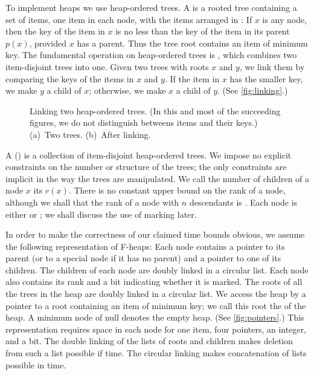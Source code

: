 To implement heaps we use heap-ordered trees. A  is a rooted
tree containing a set of items, one item in each node, with the items arranged in
: If \(x\) is any node, then the key of the item in \(x\) is no less
than the key of the item in its parent \(p(x)\), provided \(x\) has a parent. Thus
the tree root contains an item of minimum key. The fundamental operation on
heap-ordered trees is , which combines two item-disjoint trees into
one. Given two trees with roots \(x\) and \(y\), we link them by comparing the keys
of the items in \(x\) and \(y\). If the item in \(x\) has the smaller key, we make
\(y\) a child of \(x\); otherwise, we make \(x\) a child of \(y\). (See
\autoref{fig:linking}.)

\begin{figure}
    \begin{subfigure}[t]{0.50\textwidth}
        \centering
        
        \caption{}
    \end{subfigure}
    \begin{subfigure}[t]{0.49\textwidth}
        \centering
        
        \caption{}
    \end{subfigure}
    \caption{Linking two heap-ordered trees. (In this and most of the succeeding
        figures, we do not distinguish betweens items and their keys.) (a)~Two trees.
        (b)~After linking.}
    \label{fig:linking}
\end{figure}

A  () is a collection of item-disjoint heap-ordered
trees. We impose no explicit constraints on the number or structure of the trees; the
only constraints are implicit in the way the trees are manipulated. We call the
number of children of a node \(x\) its  \(r(x)\). There is no constant
upper bound on the rank of a node, although we shall that the rank of a node with
\(n\) descendants is . Each node is either  or
; we shall discuss the use of marking later.

In order to make the correctness of our claimed time bounds obvious, we assume the
following representation of F-heaps: Each node contains a pointer to its parent (or
to a special node  if it has no parent) and a pointer to one of its
children. The children of each node are doubly linked in a circular list. Each node
also contains its rank and a bit indicating whether it is marked. The roots of all
the trees in the heap are doubly linked in a circular list. We access the heap by
a pointer to a root containing an item of minimum key; we call this root the
 of the heap. A minimum node of null denotes the empty heap. (See
\autoref{fig:pointers}.) This representation requires space in each node for one
item, four pointers, an integer, and a bit. The double linking of the lists of roots
and children makes deletion from such a list possible if  time. The circular
linking makes concatenation of lists possible in  time.

